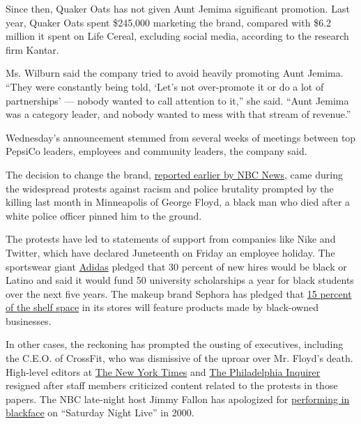 Since then, Quaker Oats has not given Aunt Jemima significant promotion.
Last year, Quaker Oats spent \$245,000 marketing the brand, compared
with \$6.2 million it spent on Life Cereal, excluding social media,
according to the research firm Kantar.

Ms. Wilburn said the company tried to avoid heavily promoting Aunt
Jemima. ``They were constantly being told, `Let's not over-promote it or
do a lot of partnerships' --- nobody wanted to call attention to it,''
she said. ``Aunt Jemima was a category leader, and nobody wanted to mess
with that stream of revenue.''

Wednesday's announcement stemmed from several weeks of meetings between
top PepsiCo leaders, employees and community leaders, the company said.

The decision to change the brand,
\href{https://www.nbcnews.com/news/us-news/aunt-jemima-brand-will-change-name-remove-image-quaker-says-n1231260?cid=sm_npd_ms_tw_ma}{reported
earlier by NBC News}, came during the widespread protests against racism
and police brutality prompted by the killing last month in Minneapolis
of George Floyd, a black man who died after a white police officer
pinned him to the ground.

The protests have led to statements of support from companies like Nike
and Twitter, which have declared Juneteenth on Friday an employee
holiday. The sportswear giant
\href{https://www.nytimes3xbfgragh.onion/2020/06/10/business/adidas-black-employees-discrimination.html}{Adidas}
pledged that 30 percent of new hires would be black or Latino and said
it would fund 50 university scholarships a year for black students over
the next five years. The makeup brand Sephora has pledged that
\href{https://www.nytimes3xbfgragh.onion/2020/06/10/business/sephora-black-owned-brands.html}{15
percent of the shelf space} in its stores will feature products made by
black-owned businesses.

In other cases, the reckoning has prompted the ousting of executives,
including the C.E.O. of CrossFit, who was dismissive of the uproar over
Mr. Floyd's death. High-level editors at
\href{https://www.nytimes3xbfgragh.onion/2020/06/07/business/media/james-bennet-resigns-nytimes-op-ed.html}{The
New York Times} and
\href{https://www.nytimes3xbfgragh.onion/2020/06/06/business/media/editor-philadephia-inquirer-resigns.html}{The
Philadelphia Inquirer} resigned after staff members criticized content
related to the protests in those papers. The NBC late-night host Jimmy
Fallon has apologized for
\href{https://www.nytimes3xbfgragh.onion/2020/05/26/us/jimmy-fallon-chris-rock-blackface.html}{performing
in blackface} on ``Saturday Night Live'' in 2000.

